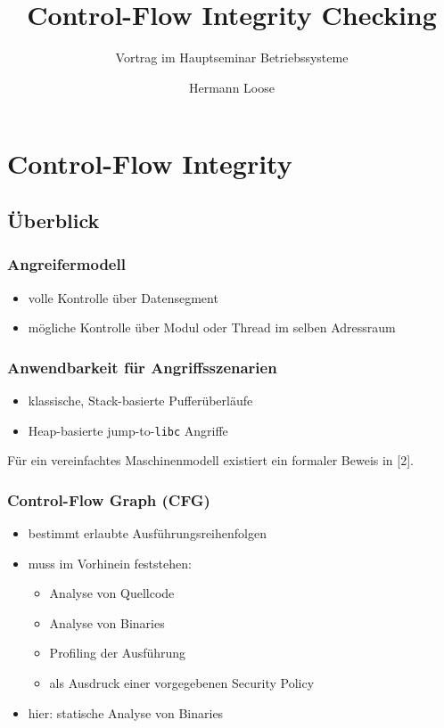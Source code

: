 \documentclass[serif,slidestop,compress,red]{beamer}
\title{Control-Flow Integrity Checking}
\subtitle{Vortrag im Hauptseminar Betriebssysteme}
\author{Hermann Loose}
\begin{document}
\lstset{
  language=[x86masm]Assembler,
  basicstyle=\ttfamily
}

\frame[plain]{\titlepage}

\section{Control-Flow Integrity}

\subsection{Überblick}

\begin{frame}
  \frametitle{Angreifermodell}
  \begin{itemize}
    \item volle Kontrolle über Datensegment
    \item mögliche Kontrolle über Modul oder Thread im selben Adressraum
  \end{itemize}
\end{frame}

\begin{frame}
  \frametitle{Anwendbarkeit für Angriffsszenarien}
  \begin{itemize}
    \item klassische, Stack-basierte Pufferüberläufe
    \item Heap-basierte jump-to-\texttt{libc} Angriffe
  \end{itemize}
  Für ein vereinfachtes Maschinenmodell existiert ein formaler Beweis in [2].
\end{frame}

\begin{frame}
  \frametitle{Control-Flow Graph (CFG)}
  \begin{itemize}
    \item bestimmt erlaubte Ausführungsreihenfolgen
    \item muss im Vorhinein feststehen:
    \begin{itemize}
      \item Analyse von Quellcode
      \item Analyse von Binaries
      \item Profiling der Ausführung
      \item als Ausdruck einer vorgegebenen Security Policy
    \end{itemize}
    \item hier: statische Analyse von Binaries
  \end{itemize}
\end{frame}
\end{document}
